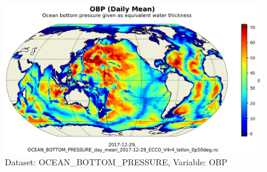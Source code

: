 \begin{longtable}{|m{}|m{}|m{}|m{}|}
\end{longtable}

\begin{figure}[H]
\centering
\includegraphics[scale=0.55]{../images/plots/latlon_plots/Ocean_Bottom_Pressure/OBP.png}
\caption{Dataset: OCEAN\_BOTTOM\_PRESSURE, Variable: OBP}
\label{tab:table-OCEAN_BOTTOM_PRESSURE_OBP-Plot}
\end{figure}
\pagebreak
